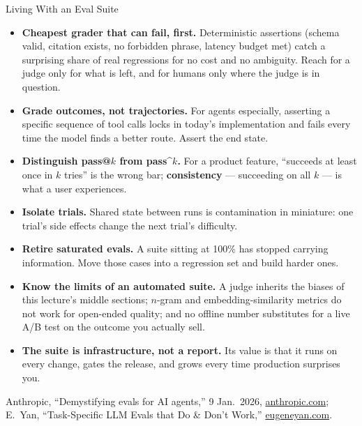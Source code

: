 \begin{frame}[allowframebreaks]{Living With an Eval Suite}
  \begin{itemize}\footnotesize\itemsep0.3em
    \item[\textcolor{red}{$\blacktriangleright$}] \textbf{Cheapest grader that can fail, first.} Deterministic assertions (schema valid, citation exists, no forbidden phrase, latency budget met) catch a surprising share of real regressions for no cost and no ambiguity. Reach for a judge only for what is left, and for humans only where the judge is in question.
    \item[\textcolor{red}{$\blacktriangleright$}] \textbf{Grade outcomes, not trajectories.} For agents especially, asserting a specific sequence of tool calls locks in today's implementation and fails every time the model finds a better route. Assert the end state.
    \item[\textcolor{red}{$\blacktriangleright$}] \textbf{Distinguish pass@$k$ from pass\textasciicircum$k$.} For a product feature, ``succeeds at least once in $k$ tries'' is the wrong bar; \textbf{consistency} --- succeeding on all $k$ --- is what a user experiences.
    \item[\textcolor{red}{$\blacktriangleright$}] \textbf{Isolate trials.} Shared state between runs is contamination in miniature: one trial's side effects change the next trial's difficulty.
    \item[\textcolor{red}{$\blacktriangleright$}] \textbf{Retire saturated evals.} A suite sitting at 100\% has stopped carrying information. Move those cases into a regression set and build harder ones.
    \item[\textcolor{red}{$\blacktriangleright$}] \textbf{Know the limits of an automated suite.} A judge inherits the biases of this lecture's middle sections; $n$-gram and embedding-similarity metrics do not work for open-ended quality; and no offline number substitutes for a live A/B test on the outcome you actually sell.
    \item[\textcolor{red}{$\blacktriangleright$}] \textbf{The suite is infrastructure, not a report.} Its value is that it runs on every change, gates the release, and grows every time production surprises you.
  \end{itemize}
  \vspace{0.1em}
  {\scriptsize Anthropic, ``Demystifying evals for AI agents,'' 9 Jan.\ 2026, \href{https://www.anthropic.com/engineering/demystifying-evals-for-ai-agents}{anthropic.com}; E.~Yan, ``Task-Specific LLM Evals that Do \& Don't Work,'' \href{https://eugeneyan.com/writing/evals/}{eugeneyan.com}.}
\end{frame}
